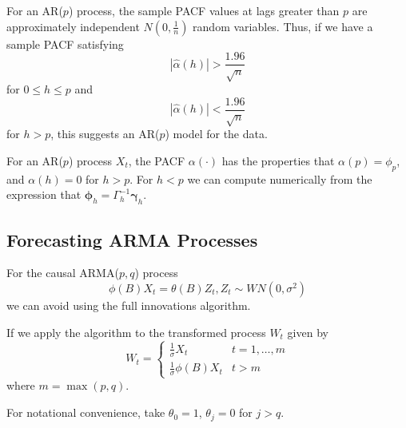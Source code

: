 \begin{thm}
  \label{defn:arma_processes:9}
  For an AR($p$) process, the sample PACF values at lags greater than
  $p$ are approximately independent $N(0, \frac{1}{n})$ random
  variables.  Thus, if we have a sample PACF satisfying
  \begin{equation}
    \label{eq:32}
    |\hat \alpha(h)| > \frac{1.96}{\sqrt{n}}
  \end{equation} for $0 \leq h \leq p$ and
  \begin{equation}
    \label{eq:33}
    |\hat \alpha(h)| < \frac{1.96}{\sqrt{n}}
  \end{equation} for $h > p$, this suggests an AR($p$) model for the data.
\end{thm}

\begin{thm}
  \label{defn:arma_processes:10}
  For an AR($p$) process $X_{t}$, the PACF $\alpha(\cdot)$ has the
  properties that $\alpha(p) = \phi_{p}$, and $\alpha(h) = 0$ for $h >
  p$.  For $h < p$ we can compute numerically from the expression that
  $\mathbf{\phi}_{h} = \Gamma^{-1}_{h} \mathbf{\gamma}_{h}$.
\end{thm}

\subsection{Forecasting ARMA Processes}
\label{sec:forec-arma-proc}

For the causal ARMA($p, q$) process
\begin{equation}
  \label{eq:35}
  \phi(B) X_{t} = \theta(B) Z_{t}, Z_{t} \sim WN(0, \sigma^{2})
\end{equation} we can avoid using the full innovations algorithm.

If we apply the algorithm to the transformed process $W_{t}$ given by
\begin{equation}
  \label{eq:36}
  W_{t} =
  \begin{cases}
    \frac{1}{\sigma} X_{t} & t = 1, \dots, m \\
    \frac{1}{\sigma} \phi(B) X_{t} & t > m
  \end{cases}
\end{equation} where $m = \max(p, q)$.

For notational convenience, take $\theta_{0} = 1$, $\theta_{j} = 0 $
for $j > q$.

